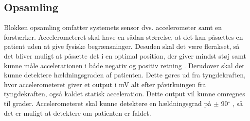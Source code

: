 
\subsection{Opsamling}
Blokken opsamling omfatter systemets sensor dvs. accelerometer samt en forstærker. Accelerometeret skal have en sådan størrelse, at det kan påsættes en patient uden at give fysiske begrænsninger. Desuden skal det være flerakset, så det bliver muligt at påsætte det i en optimal position, der giver mindst støj samt kunne måle accelerationen i både negativ og positiv retning . Derudover skal det kunne detektere hældningsgraden af patienten. Dette gøres ud fra tyngdekraften, hvor accelerometeret giver et output i mV alt efter påvirkningen fra tyngdekraften, også kaldet statisk acceleration. Dette output vil kunne omregnes til grader. Accelerometeret skal kunne detektere en hældningsgrad på $\pm$ 90$^{\circ}$ , så det er muligt at detektere om patienten er faldet. \\
